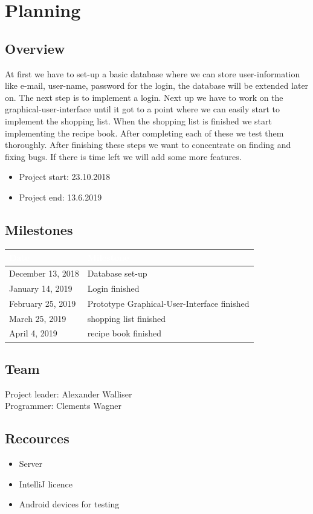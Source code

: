 \documentclass[12pt]{article}
\theoremstyle{definition}
\begin{document}
\pagebreak

\section{Planning}
\subsection{Overview}
At first we have to set-up a basic database where we can store user-information like e-mail, user-name, password for the login, the database will be extended later on. The next step is to implement a login. Next up we have to work on the graphical-user-interface until it got to a point where we can easily start to implement the shopping list. When the shopping list is finished we start implementing the recipe book. After completing each of these we test them thoroughly. After finishing these steps we want to concentrate on finding and fixing bugs. If there is time left we will add some more features.
\begin{itemize}
\item Project start: 23.10.2018
\item Project end: 13.6.2019
\end{itemize}

\subsection{Milestones}
\begin{tabular}{|l|l|}
\hline
\cellcolor[gray]{0.5}\textcolor{white}{Date} &
\cellcolor[gray]{0.5}\textcolor{white}{Milestone} \\ \hline
December 13, 2018 & Database set-up \\ \hline
January 14, 2019 & Login finished \\ \hline
February 25, 2019 & Prototype Graphical-User-Interface finished \\ \hline
March 25, 2019 & shopping list finished \\ \hline
April 4, 2019 & recipe book finished \\ \hline
\end{tabular}

\subsection{Team}
Project leader: Alexander Walliser \\
Programmer: Clements Wagner
\subsection{Recources}
\begin{itemize}
\item Server
\item IntelliJ licence
\item Android devices for testing
\end{itemize}
\end{document}
